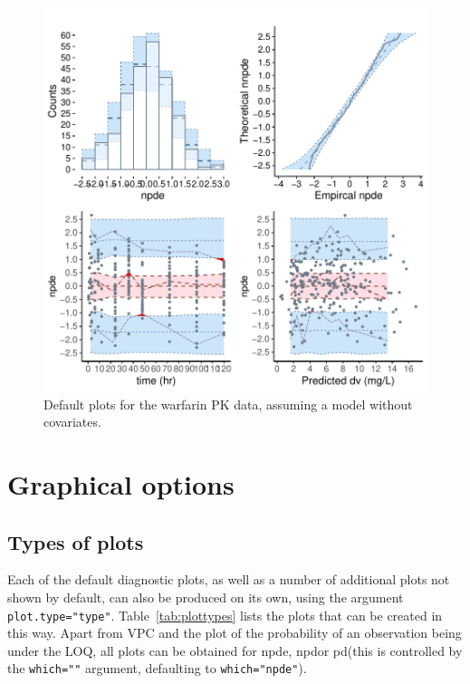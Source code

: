 \documentclass{article}
\def\npde{{\rm npde}}
\def\npd{{\rm npd}}
\def\pd{{\rm pd}}
\begin{document}
\begin{figure}[!h]
\begin{center}
\includegraphics{demoGraphs-defplotsWarfBase}
\end{center}
\par \kern -0.5cm
\caption{Default plots for the warfarin PK data, assuming a model without covariates.} \label{fig:defWbase}
\end{figure}

\clearpage
\newpage
\section{Graphical options}

\subsection{Types of plots} \label{sec:plotTypes}

\hskip 18pt Each of the default diagnostic plots, as well as a number of additional plots not shown by default, can also be produced on its own, using the argument \verb+plot.type="type"+. Table~\ref{tab:plottypes} lists the plots that can be created in this way. Apart from VPC and the plot of the probability of an observation being under the LOQ, all plots can be obtained for \npde, \npd or \pd (this is controlled by the \verb+which=""+ argument, defaulting to \verb+which="npde"+).
\end{document}

